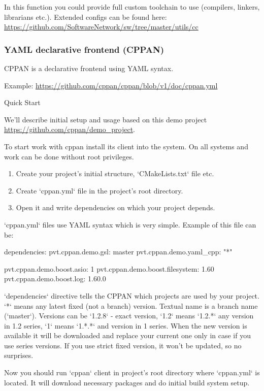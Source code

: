 In this function you could provide full custom toolchain to use (compilers, linkers, librarians etc.).
Extended configs can be found here: \url{https://github.com/SoftwareNetwork/sw/tree/master/utils/cc}


\subsubsection{YAML declarative frontend (CPPAN)}

CPPAN is a declarative frontend using YAML syntax.

Example: \url{https://github.com/cppan/cppan/blob/v1/doc/cppan.yml}

Quick Start

We'll describe initial setup and usage based on this demo project \url{https://github.com/cppan/demo_project}.

To start work with cppan install its client into the system. On all systems and work can be done without root privileges.
\begin{enumerate}
\item
Create your project's initial structure, `CMakeLists.txt` file etc.
\item
Create `cppan.yml` file in the project's root directory.
\item
Open it and write dependencies on which your project depends.
\end{enumerate}

`cppan.yml` files use YAML syntax which is very simple. Example of this file can be:

\begin{cppan}
    dependencies:
        pvt.cppan.demo.gsl: master
        pvt.cppan.demo.yaml_cpp: "*"

        pvt.cppan.demo.boost.asio: 1
        pvt.cppan.demo.boost.filesystem: 1.60
        pvt.cppan.demo.boost.log: 1.60.0
\end{cppan}

`dependencies` directive tells the CPPAN which projects are used by your project. `*` means any latest fixed (not a branch) version. Textual name is a branch name (`master`). Versions can be `1.2.8` - exact version, `1.2` means `1.2.*` any version in 1.2 series, `1` means `1.*.*` and version in 1 series. When the new version is available it will be downloaded and replace your current one only in case if you use series versions. If you use strict fixed version, it won't be updated, so no surprises.

Now you should run `cppan` client in project's root directory where `cppan.yml` is located. It will download necessary packages and do initial build system setup.

